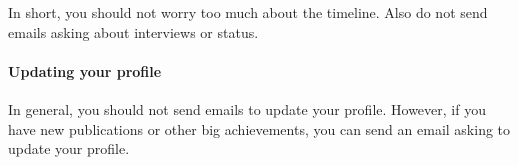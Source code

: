 \documentclass[oneside,11pt]{memoir}
\begin{document}
In short, you should not worry too much about the timeline. Also do not send emails asking about interviews or status.


\paragraph{Updating your profile} In general, you should not send emails to update your profile.  However, if you have new publications or other big achievements, you can send an email asking to update your profile.












\end{document}
